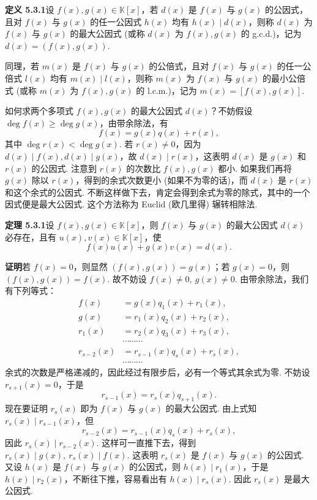 \documentclass[UTF8,12pt,a4paper,fontset=fandol]{ctexart}
\begin{document}
\noindent\textbf{定义 5.3.1}\quad 设 $f(x),g(x)\in\mathbb{K}[x]$，若 $d(x)$ 是 $f(x)$ 与 $g(x)$ 的公因式，且对 $f(x)$ 与 $g(x)$ 的任一公因式 $h(x)$ 均有 $h(x)\mid d(x)$，则称 $d(x)$ 为 $f(x)$ 与 $g(x)$ 的最大公因式 (或称 $d(x)$ 为 $f(x),g(x)$ 的 g.c.d.)，记为 $d(x)=(f(x),g(x))$.

同理，若 $m(x)$ 是 $f(x)$ 与 $g(x)$ 的公倍式，且对 $f(x)$ 与 $g(x)$ 的任一公倍式 $l(x)$ 均有 $m(x)\mid l(x)$，则称 $m(x)$ 为 $f(x)$ 与 $g(x)$ 的最小公倍式 (或称 $m(x)$ 为 $f(x),g(x)$ 的 l.c.m.)，记为 $m(x)=[f(x),g(x)]$.

如何求两个多项式 $f(x),g(x)$ 的最大公因式 $d(x)$？不妨假设 $\deg f(x)\geq \deg g(x)$，由带余除法，有
\[
f(x)=g(x)q(x)+r(x),
\]
其中 $\deg r(x)<\deg g(x)$. 若 $r(x)\neq 0$，因为 $d(x)\mid f(x),d(x)\mid g(x)$，故 $d(x)\mid r(x)$，这表明 $d(x)$ 是 $g(x)$ 和 $r(x)$ 的公因式. 注意到 $r(x)$ 的次数比 $f(x),g(x)$ 都小. 如果我们再将 $g(x)$ 除以 $r(x)$，得到的余式次数更小 (如果不为零的话)，而 $d(x)$ 是 $r(x)$ 和这个余式的公因式. 不断这样做下去，肯定会得到余式为零的除式，其中的一个因式便是最大公因式. 这个方法称为 Euclid (欧几里得) 辗转相除法.

\noindent\textbf{定理 5.3.1}\quad 设 $f(x),g(x)\in\mathbb{K}[x]$，则 $f(x)$ 与 $g(x)$ 的最大公因式 $d(x)$ 必存在，且有 $u(x),v(x)\in\mathbb{K}[x]$，使
\begin{equation}
f(x)u(x)+g(x)v(x)=d(x).
\tag{5.3.1}
\end{equation}

\noindent\textbf{证明}\quad 若 $f(x)=0$，则显然 $(f(x),g(x))=g(x)$；若 $g(x)=0$，则 $(f(x),g(x))=f(x)$. 故不妨设 $f(x)\neq 0,\ g(x)\neq 0$. 由带余除法，我们有下列等式：
\[
\begin{aligned}
f(x)&=g(x)q_1(x)+r_1(x),\\
g(x)&=r_1(x)q_2(x)+r_2(x),\\
r_1(x)&=r_2(x)q_3(x)+r_3(x),\\
&\cdots\cdots\cdots\\
r_{s-2}(x)&=r_{s-1}(x)q_s(x)+r_s(x),\\
&\cdots\cdots\cdots
\end{aligned}
\]
余式的次数是严格递减的，因此经过有限步后，必有一个等式其余式为零. 不妨设 $r_{s+1}(x)=0$，于是
\[
r_{s-1}(x)=r_s(x)q_{s+1}(x).
\]
现在要证明 $r_s(x)$ 即为 $f(x)$ 与 $g(x)$ 的最大公因式. 由上式知 $r_s(x)\mid r_{s-1}(x)$，但
\begin{equation}
r_{s-2}(x)=r_{s-1}(x)q_s(x)+r_s(x),
\tag{5.3.2}
\end{equation}
因此 $r_s(x)\mid r_{s-2}(x)$. 这样可一直推下去，得到 $r_s(x)\mid g(x),\ r_s(x)\mid f(x)$. 这表明 $r_s(x)$ 是 $f(x)$ 与 $g(x)$ 的公因式. 又设 $h(x)$ 是 $f(x)$ 与 $g(x)$ 的公因式，则 $h(x)\mid r_1(x)$，于是 $h(x)\mid r_2(x)$，不断往下推，容易看出有 $h(x)\mid r_s(x)$. 因此 $r_s(x)$ 是最大公因式.
\end{document}
